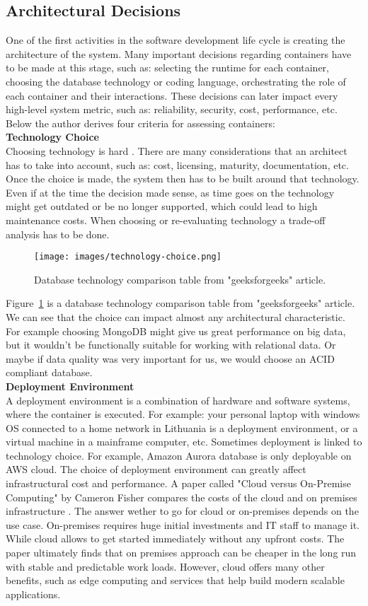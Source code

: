 \documentclass[12pt]{article}
\begin{document}
\subsection{Architectural Decisions}
One of the first activities in the software development life cycle is creating the architecture of the system. Many important decisions regarding containers have to be made at this stage, such as: selecting the runtime for each container, choosing the database technology or coding language, orchestrating the role of each container and their interactions. These decisions can later impact every high-level system metric, such as: reliability, security, cost, performance, etc. Below the author derives four criteria for assessing containers:
\\\textbf{Technology Choice}\\
Choosing technology is hard \cite{Naz21}. There are many considerations that an architect has to take into account, such as: cost, licensing, maturity, documentation, etc. Once the choice is made, the system then has to be built around that technology. Even if at the time the decision made sense, as time goes on the technology might get outdated or be no longer supported, which could lead to high maintenance costs. When choosing or re-evaluating technology a trade-off analysis has to be done.
\begin{figure}[H]
    \centering
    \texttt{[image: images/technology-choice.png]}
    \caption{Database technology comparison table from "geeksforgeeks" article.}
    \label{fig:technology-choice}
\end{figure}
Figure~\ref{fig:technology-choice} is a database technology comparison table from "geeksforgeeks" article. We can see that the choice can impact almost any architectural characteristic. For example choosing MongoDB might give us great performance on big data, but it wouldn't be functionally suitable for working with relational data. Or maybe if data quality was very important for us, we would choose an ACID compliant database.
\\\textbf{Deployment Environment}\\
A deployment environment is a combination of hardware and software systems, where the container is executed. For example:  your personal laptop with windows OS connected to a home network in Lithuania is a deployment environment, or a virtual machine in a mainframe computer, etc. Sometimes deployment is linked to technology choice. For example, Amazon Aurora database is only deployable on AWS cloud. The choice of deployment environment can greatly affect infrastructural cost and performance. A paper called "Cloud versus On-Premise Computing" by Cameron Fisher compares the costs of the cloud and on premises infrastructure \cite{Fis18}. The answer wether to go for cloud or on-premises depends on the use case. On-premises requires huge initial investments and IT staff to manage it. While cloud allows to get started immediately without any upfront costs. The paper ultimately finds that on premises approach can be cheaper in the long run with stable and predictable work loads. However, cloud offers many other benefits, such as edge computing and services that help build modern scalable applications.
\end{document}
